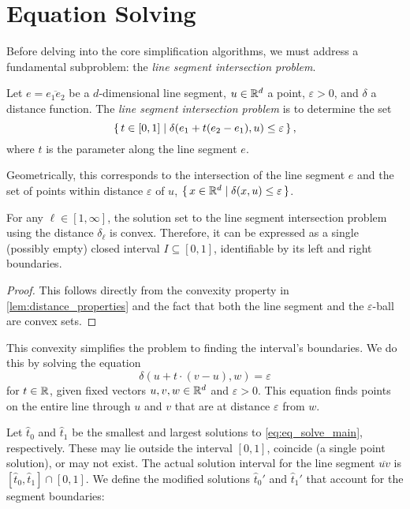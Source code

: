 \section{Equation Solving}
\label{sec:equation_solving}
Before delving into the core simplification algorithms, we must address a fundamental subproblem: the \emph{line segment intersection problem}.

\begin{definition}
  Let \(e = \overline{e_1e_2}\) be a \(d\)-dimensional line segment, \(u \in \mathbb{R}^d\) a point, \(\varepsilon > 0\), and \(\delta\) a distance function. The \emph{line segment intersection problem} is to determine the set
	\[\set{t \in [0, 1] \mid \delta(e_1 + t(e_2 - e_1), u) \leq \varepsilon},\]
	where \(t\) is the parameter along the line segment \(e\).

  Geometrically, this corresponds to the intersection of the line segment \(e\) and the set of points within distance \(\varepsilon\) of \(u\), \(\set{x \in \mathbb{R}^d \mid \delta(x, u) \leq \varepsilon}\).
\end{definition}

\begin{observation}
	For any \(\ell \in [1, \infty]\), the solution set to the line segment intersection problem using the distance \(\delta_\ell\) is convex. Therefore, it can be expressed as a single (possibly empty) closed interval \(I \subseteq [0, 1]\), identifiable by its left and right boundaries.
\end{observation}

\begin{proof}
  This follows directly from the convexity property in \cref{lem:distance_properties} and the fact that both the line segment and the \(\varepsilon\)-ball are convex sets.
\end{proof}

This convexity simplifies the problem to finding the interval's boundaries. We do this by solving the equation
\begin{equation}
  \delta(u + t \cdot (v - u), w) = \varepsilon \label{eq:eq_solve_main}
\end{equation}
for \(t \in \mathbb{R}\), given fixed vectors \(u, v, w \in \mathbb{R}^d\) and \(\varepsilon > 0\). This equation finds points on the entire line through \(u\) and \(v\) that are at distance \(\varepsilon\) from \(w\).

Let \(\hat{t}_0\) and \(\hat{t}_1\) be the smallest and largest solutions to \cref{eq:eq_solve_main}, respectively. These may lie outside the interval \([0,1]\), coincide (a single point solution), or may not exist. The actual solution interval for the line segment \(\overline{uv}\) is \([\hat t_0, \hat t_1] \cap [0, 1]\). We define the modified solutions \(\hat{t}_0'\) and \(\hat{t}_1'\) that account for the segment boundaries:

